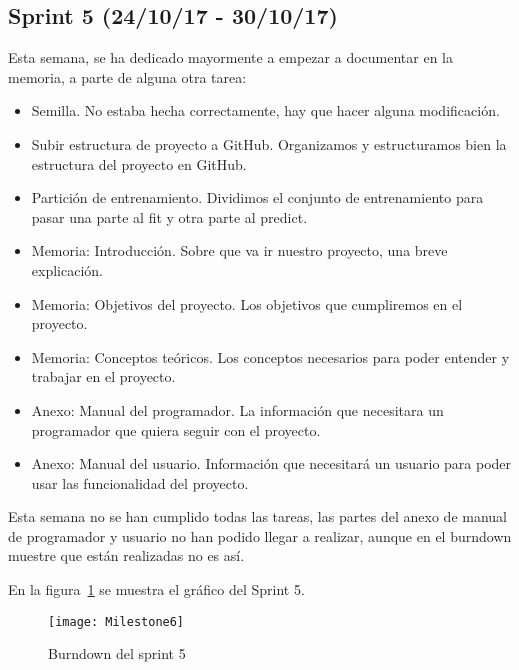 \subsection{Sprint 5 (24/10/17 - 30/10/17)}
Esta semana, se ha dedicado mayormente a empezar a documentar en la memoria, a parte de alguna otra tarea:
\begin{itemize}
\item Semilla. No estaba hecha correctamente, hay que hacer alguna modificación.
\item Subir estructura de proyecto a GitHub. Organizamos y estructuramos bien la estructura del proyecto en GitHub.
\item Partición de entrenamiento. Dividimos el conjunto de entrenamiento para pasar una parte al fit y otra parte al predict.
\item Memoria: Introducción. Sobre que va ir nuestro proyecto, una breve explicación.
\item Memoria: Objetivos del proyecto. Los objetivos que cumpliremos en el proyecto.
\item Memoria: Conceptos teóricos. Los conceptos necesarios para poder entender y trabajar en el proyecto.
\item Anexo: Manual del programador. La información que necesitara un programador que quiera seguir con el proyecto.
\item Anexo: Manual del usuario. Información que necesitará un usuario para poder usar las funcionalidad del proyecto.
\end{itemize}

Esta semana no se han cumplido todas las tareas, las partes del anexo de manual de programador y usuario no han podido llegar a realizar, aunque en el burndown muestre que están realizadas no es así.

En la figura~\ref{fig:Milestone6} se muestra el gráfico del Sprint 5.

\begin{figure}
\centering
\texttt{[image: Milestone6]}
\caption{Burndown del sprint 5}
\label{fig:Milestone6}
\end{figure}

